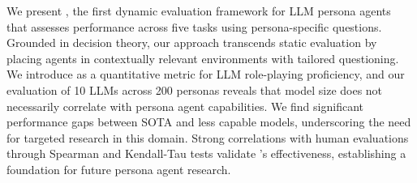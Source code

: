 We present \benchmark, the first dynamic evaluation framework for LLM persona agents that assesses performance across five tasks using persona-specific questions. Grounded in decision theory, our approach transcends static evaluation by placing agents in contextually relevant environments with tailored questioning. We introduce \score as a quantitative metric for LLM role-playing proficiency, and our evaluation of 10 LLMs across 200 personas reveals that model size does not necessarily correlate with persona agent capabilities. We find significant performance gaps between SOTA and less capable models, underscoring the need for targeted research in this domain. Strong correlations with human evaluations through Spearman and Kendall-Tau tests validate \benchmark's effectiveness, establishing a foundation for future persona agent research.